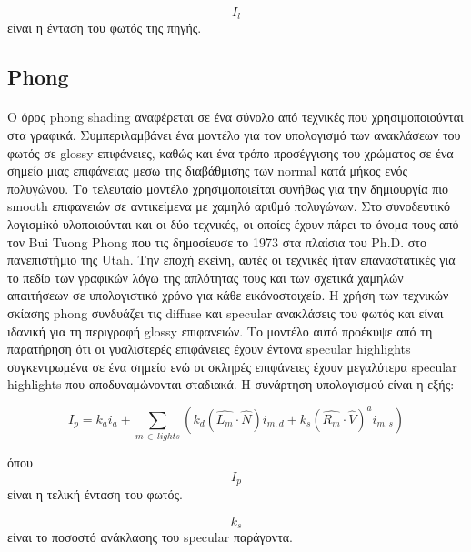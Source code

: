 \begin{sloppypar}
\begin{equation}
I_l
\end{equation}
είναι η ένταση του φωτός της πηγής.

\subsection{Phong}
\paragraph{}
	Ο όρος phong shading αναφέρεται σε ένα σύνολο από τεχνικές που χρησιμοποιούνται στα γραφικά. Συμπεριλαμβάνει ένα μοντέλο
για τον υπολογισμό των ανακλάσεων του φωτός σε glossy επιφάνειες, καθώς και ένα τρόπο προσέγγισης του χρώματος σε ένα σημείο
μιας επιφάνειας μεσω της διαβάθμισης των normal κατά μήκος ενός πολυγώνου. Το τελευταίο μοντέλο χρησιμοποιείται συνήθως για την
δημιουργία πιο smooth επιφανειών σε αντικείμενα με χαμηλό αριθμό πολυγώνων. Στο συνοδευτικό λογισμiκό υλοποιούνται και οι δύο
τεχνικές, οι οποίες έχουν πάρει το όνομα τους από τον Bui Tuong Phong που τις δημοσίευσε το 1973 στα πλαίσια του Ph.D. στο 
πανεπιστήμιο της Utah. Την εποχή εκείνη, αυτές οι τεχνικές ήταν επαναστατικές για το πεδίο των γραφικών λόγω της απλότητας τους
και των σχετικά χαμηλών απαιτήσεων σε υπολογιστικό χρόνο για κάθε εικόνοστοιχείο. Η χρήση των τεχνικών σκίασης phong συνδυάζει 
τις diffuse και specular ανακλάσεις του φωτός και είναι ιδανική για τη περιγραφή glossy επιφανειών. Το μοντέλο αυτό προέκυψε από τη
παρατήρηση ότι οι γυαλιστερές επιφάνειες έχουν έντονα specular highlights συγκεντρωμένα σε ένα σημείο ενώ οι σκληρές επιφάνειες έχουν 
μεγαλύτερα specular highlights που αποδυναμώνονται σταδιακά. Η συνάρτηση υπολογισμού είναι η εξής:

\begin{equation}
I_p = k_a i_a + \sum\limits_{m \, \in \, lights} (k_d(\hat{L_m} \cdot \hat{N})i_{m,d} + k_s(\hat{R_m} \cdot \hat{V})^a i_{m,s} )
\end{equation}

όπου\\

\begin{equation}
I_p
\end{equation}
είναι η τελική ένταση του φωτός.

\begin{equation}
k_s
\end{equation}
είναι το ποσοστό ανάκλασης του specular παράγοντα.


\end{sloppypar}
